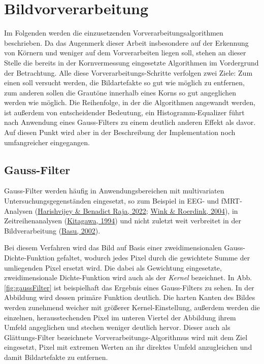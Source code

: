 \documentclass[
  12pt,
  openany]{book}
\begin{document}
\hypertarget{bildvorverarbeitung}{%
\section{Bildvorverarbeitung}\label{bildvorverarbeitung}}

Im Folgenden werden die einzusetzenden Vorverarbeitungsalgorithmen beschrieben. Da das Augenmerk dieser Arbeit insbesondere auf der Erkennung von Körnern und weniger auf dem Vorverarbeiten liegen soll, stehen an dieser Stelle die bereits in der Kornvermessung eingesetzte Algorithmen im Vordergrund der Betrachtung.
Alle diese Vorverarbeitungs-Schritte verfolgen zwei Ziele:
Zum einen soll versucht werden, die Bildartefakte so gut wie möglich zu entfernen, zum anderen sollen die Grautöne innerhalb eines Korns so gut angeglichen werden wie möglich.
Die Reihenfolge, in der die Algorithmen angewandt werden, ist außerdem von entscheidender Bedeutung, ein Histogramm-Equalizer führt nach Anwendung eines Gauss-Filters zu einem deutlich anderen Effekt als davor. Auf diesen Punkt wird aber in der Beschreibung der Implementation noch umfangreicher eingegangen.

\hypertarget{gauss-filter}{%
\subsection{Gauss-Filter}\label{gauss-filter}}

Gauss-Filter werden häufig in Anwendungsbereichen mit multivariaten Untersuchungsgegenständen eingesetzt, so zum Beispiel in EEG- und fMRT-Analysen (\protect\hyperlink{ref-harishvijeyAutomatedTechniqueEEG2022}{Harishvijey \& Benadict Raja, 2022}; \protect\hyperlink{ref-winkDenoisingFunctionalMR2004}{Wink \& Roerdink, 2004}), in Zeitreihenanalysen (\protect\hyperlink{ref-kitagawaTwofilterFormulaSmoothing1994}{Kitagawa, 1994}) und nicht zuletzt weit verbreitet in der Bildverarbeitung (\protect\hyperlink{ref-basuGaussianbasedEdgedetectionMethodsa2002}{Basu, 2002}).

Bei diesem Verfahren wird das Bild auf Basis einer zweidimensionalen Gauss-Dichte-Funktion gefaltet, wodurch jedes Pixel durch die gewichtete Summe der umliegenden Pixel ersetzt wird. Die dabei als Gewichtung eingesetzte, zweidimensionale Dichte-Funktion wird auch als der \emph{Kernel} bezeichnet. In Abb. \ref{fig:gaussFilter} ist beispielhaft das Ergebnis eines Gauss-Filters zu sehen. In der Abbildung wird dessen primäre Funktion deutlich. Die harten Kanten des Bildes werden zunehmend weicher mit größerer Kernel-Einstellung, außerdem werden die einzelnen, herausstechenden Pixel im unteren Viertel der Abbildung ihrem Umfeld angeglichen und stechen weniger deutlich hervor.
Dieser auch als Glättungs-Filter bezeichnete Vorverarbeitungs-Algorithmus wird mit dem Ziel eingesetzt, Pixel mit extremen Werten an ihr direktes Umfeld anzugleichen und damit Bildartefakte zu entfernen.
\end{document}
